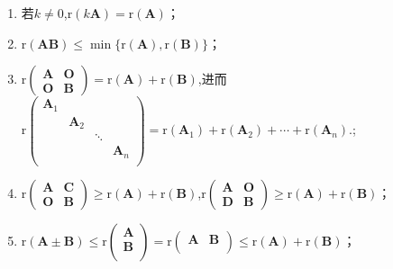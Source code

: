 \documentclass[../../main.tex]{subfiles}
\begin{document}
\begin{proposition}[矩阵秩的基本公式]\label{proposition:矩阵秩的基本公式}
\begin{enumerate}[(1)]
\item \label{矩阵秩的基本公式1}若\(k\neq0\),\(\mathrm{r}(k\boldsymbol{A})=\mathrm{r}(\boldsymbol{A})\)；

\item \label{矩阵秩的基本公式2}\(\mathrm{r}(\boldsymbol{A}\boldsymbol{B})\leqslant \min\{\mathrm{r}(\boldsymbol{A}),\mathrm{r}(\boldsymbol{B})\}\)；

\item \label{矩阵秩的基本公式3}\(\mathrm{r}\begin{pmatrix}\boldsymbol{A}&\boldsymbol{O}\\\boldsymbol{O}&\boldsymbol{B}\end{pmatrix}=\mathrm{r}(\boldsymbol{A})+\mathrm{r}(\boldsymbol{B})\),进而$\mathrm{r}\left( \begin{matrix}
\boldsymbol{A}_1&		&		&		\\
&		\boldsymbol{A}_2&		&		\\
&		&		\ddots&		\\
&		&		&		\boldsymbol{A}_n\\
\end{matrix} \right) =\mathrm{r}\left( \boldsymbol{A}_1 \right) +\mathrm{r}\left( \boldsymbol{A}_2 \right) +\cdots +\mathrm{r}\left( \boldsymbol{A}_n \right) .$;

\item \label{矩阵秩的基本公式4}\(\mathrm{r}\begin{pmatrix}\boldsymbol{A}&\boldsymbol{C}\\\boldsymbol{O}&\boldsymbol{B}\end{pmatrix}\geqslant \mathrm{r}(\boldsymbol{A})+\mathrm{r}(\boldsymbol{B})\),\(\mathrm{r}\begin{pmatrix}\boldsymbol{A}&\boldsymbol{O}\\\boldsymbol{D}&\boldsymbol{B}\end{pmatrix}\geqslant \mathrm{r}(\boldsymbol{A})+\mathrm{r}(\boldsymbol{B})\)；

\item \label{矩阵秩的基本公式5}\(\mathrm{r}\left( \boldsymbol{A}\pm \boldsymbol{B} \right) \leqslant \mathrm{r}\left( \begin{array}{c}
\boldsymbol{A}\\
\boldsymbol{B}\\
\end{array} \right) =\mathrm{r}\left( \begin{matrix}
\boldsymbol{A}&		\boldsymbol{B}\\
\end{matrix} \right) \leqslant \mathrm{r}\left( \boldsymbol{A} \right) +\mathrm{r}\left( \boldsymbol{B} \right) \)；


\end{enumerate}
\end{proposition}
\end{document}
